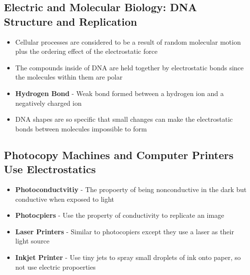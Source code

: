 \subsection{Electric and Molecular Biology: DNA Structure and Replication}
\begin{itemize}
    \item Cellular processes are considered to be a result of random molecular motion plus the ordering effect of the electrostatic force
    \item The compounds inside of DNA are held together by electrostatic bonds since the molecules within them are polar
    \item \textbf{Hydrogen Bond} -  Weak bond formed between a hydrogen ion and a negatively charged ion
    \item DNA shapes are so specific that small changes can make the electrostatic bonds between molecules impossible to form
\end{itemize}

\subsection{Photocopy Machines and Computer Printers Use Electrostatics}
\begin{itemize}
    \item \textbf{Photoconductvitiy} - The propoerty of being nonconductive in the dark but conductive when exposed to light
    \item \textbf{Photocpiers} - Use the property of conductivity to replicate an image
    \item \textbf{Laser Printers} - Similar to photocopiers except they use a laser as their light source
    \item \textbf{Inkjet Printer} - Use tiny jets to spray small droplets of ink onto paper, so not use electric propoerties
\end{itemize}

